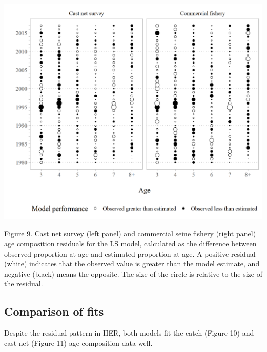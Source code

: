 \documentclass[]{article}
\begin{document}
\includegraphics[width=1\linewidth]{../../HER/figs/LS/LS_agecomps_residplot}

Figure 9. Cast net survey (left panel) and commercial seine fishery
(right panel) age composition residuals for the LS model, calculated as
the difference between observed proportion-at-age and estimated
proportion-at-age. A positive residual (white) indicates that the
observed value is greater than the model estimate, and negative (black)
means the opposite. The size of the circle is relative to the size of
the residual.

\subsection{Comparison of fits}\label{comparison-of-fits}

Despite the residual pattern in HER, both models fit the catch (Figure
10) and cast net (Figure 11) age composition data well.
\end{document}
